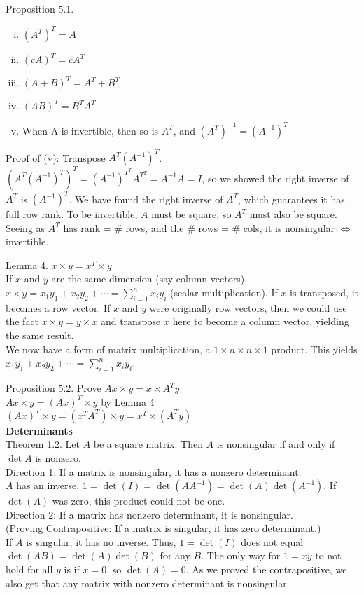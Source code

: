\documentclass[12pt]{article}
\begin{document}
Proposition 5.1.

\begin{enumerate}[(i)]
\item $(A^T)^T = A$
\item $(cA)^T = cA^T$
\item $(A+B)^T = A^T + B^T$
\item $(AB)^T = B^T A^T$
\item When A is invertible, then so is $A^T$, and $(A^T)^{-1} = (A^{-1})^T$
\end{enumerate}

Proof of (v): Transpose $A^T(A^{-1})^T$.
$(A^T(A^{-1})^T)^T = (A^{-1})^{T^T} A^{T^T} = A^{-1}A = I$, so we showed the right inverse of $A^T$ is $(A^{-1})^T$. We have found the right inverse of $A^T$, which guarantees it has full row rank. To be invertible, $A$ must be square, so $A^T$ must also be square. Seeing as $A^T$ has rank = $\#$ rows, and the $\#$ rows = $\#$ cols, it is nonsingular $\Leftrightarrow$ invertible.

Lemma 4. $x \times y = x^T \times y$\\
If $x$ and $y$ are the same dimension (say column vectors), $x \times y = x_1y_1 + x_2y_2 + \cdots = \sum_{i=1}^{n} x_iy_i$ (scalar multiplication).
If $x$ is transposed, it becomes a row vector. If $x$ and $y$ were originally row vectors, then we could use the fact $x \times  y = y \times x$ and transpose $x$ here to become a column vector, yielding the same result.\\
We now have a form of matrix multiplication, a $1 \times n \times n \times 1$ product. This yields $x_1y_1 + x_2y_2 + \cdots = \sum_{i=1}^{n} x_i y_i$.


Proposition 5.2. Prove $Ax \times y = x \times A^T y$\\
$Ax \times y = (Ax)^T \times y$ by Lemma 4\\
$(Ax)^T \times y = (x^T A^T) \times y  = x^T \times (A^T y)$\\


\textbf{Determinants}\\

Theorem 1.2. Let $A$ be a square matrix. Then $A$ is nonsingular if and only if $\det A$ is nonzero.\\
Direction 1: If a matrix is nonsingular, it has a nonzero determinant.\\
$A$ has an inverse. $1=\det(I) = \det(AA^{-1}) = \det(A) \det(A^{-1})$. If $\det(A)$ was zero, this product could not be one.\\
Direction 2: If a matrix has nonzero determinant, it is nonsingular.\\
(Proving Contrapositive: If a matrix is singular, it has zero determinant.)\\
If $A$ is singular, it has no inverse. Thus, $1=\det(I)$ does not equal $\det(AB)=\det(A)\det(B)$ for any $B$. The only way for $1=xy$ to not hold for all $y$ is if $x=0$, so $\det(A) = 0$. As we proved the contrapositive, we also get that any matrix with nonzero determinant is nonsingular.\\
\end{document}
